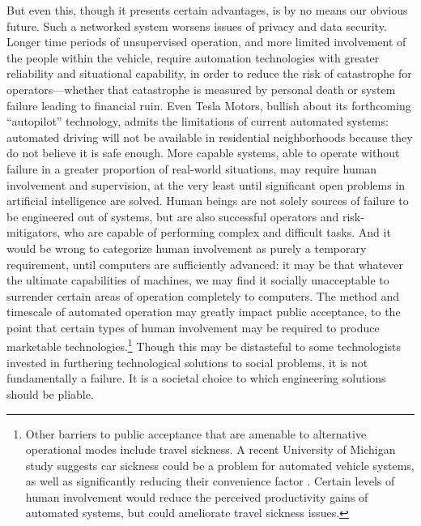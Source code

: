 But even this, though it presents certain advantages, is by no means
our obvious future. Such a networked system worsens issues of privacy
and data security. Longer time periods of unsupervised operation, and
more limited involvement of the people within the vehicle, require
automation technologies with greater reliability and situational
capability, in order to reduce the risk of catastrophe for
operators---whether that catastrophe is measured by personal death or
system failure leading to financial ruin. Even Tesla Motors, bullish
about its forthcoming ``autopilot'' technology, admits the limitations
of current automated systems: automated driving will not be available
in residential neighborhoods because they do not believe it is safe
enough\cite{???-http://www.slashgear.com/tesla-model-s-autopilot-update-due-in-3-4-months-19374458/}.
More capable systems, able to operate without failure in a greater
proportion of real-world situations, may require human involvement and
supervision, at the very least until significant open problems in
artificial intelligence are solved. Human beings are not solely
sources of failure to be engineered out of systems, but are also
successful operators and risk-mitigators, who are capable of
performing complex and difficult tasks. And it would be wrong to
categorize human involvement as purely a temporary requirement, until
computers are sufficiently advanced:  it
may be that whatever the ultimate capabilities of machines, we may
find it socially unacceptable to surrender certain areas of operation
completely to computers. The method and timescale of automated
operation may greatly impact 
public acceptance, to the point that certain types of human
involvement may be required to produce marketable
technologies.\footnote{Other barriers to public acceptance that are
  amenable to alternative operational modes include travel sickness. A
  recent University of Michigan study suggests car sickness could be a
  problem for automated vehicle systems, as well as significantly reducing their
  convenience factor
  \cite{???-http://www.telegraph.co.uk/finance/newsbysector/industry/engineering/11523167/Why-travel-sickness-could-put-the-brakes-on-driverless-cars.html}.
  Certain levels of human involvement would reduce the perceived productivity
  gains of automated systems, but could ameliorate travel sickness issues.} Though
this may be distasteful to some technologists invested in furthering
technological solutions to social problems, it is not fundamentally
a failure. It is a societal choice to which engineering solutions
should be pliable.

